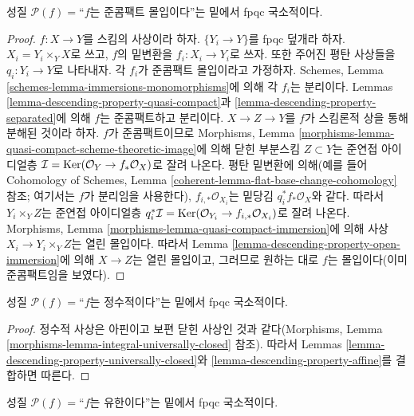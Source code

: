 \begin{lemma}
\label{lemma-descending-property-quasi-compact-immersion}
성질 $\mathcal{P}(f) =$“$f$는 준콤팩트 몰입이다”는 밑에서 fpqc
국소적이다.
\end{lemma}

\begin{proof}
$f : X \to Y$를 스킴의 사상이라 하자. $\{Y_i \to Y\}$를 fpqc
덮개라 하자. $X_i = Y_i \times_Y X$로 쓰고, $f$의 밑변환을
$f_i : X_i \to Y_i$로 쓰자. 또한 주어진 평탄 사상들을
$q_i : Y_i \to Y$로 나타내자. 각 $f_i$가 준콤팩트 몰입이라고
가정하자. Schemes, Lemma
\ref{schemes-lemma-immersions-monomorphisms}에 의해 각 $f_i$는 분리이다.
Lemmas \ref{lemma-descending-property-quasi-compact}과
\ref{lemma-descending-property-separated}에 의해 $f$는 준콤팩트하고
분리이다. $X \to Z \to Y$를 $f$가 스킴론적 상을 통해 분해된 것이라
하자. $f$가 준콤팩트이므로 Morphisms, Lemma
\ref{morphisms-lemma-quasi-compact-scheme-theoretic-image}에 의해 닫힌
부분스킴 $Z \subset Y$는 준연접 아이디얼층
$\mathcal{I} = \mathop{\mathrm{Ker}}(\mathcal{O}_Y \to f_*\mathcal{O}_X)$로 잘려 나온다.
평탄 밑변환에 의해(예를 들어 Cohomology of Schemes, Lemma
\ref{coherent-lemma-flat-base-change-cohomology} 참조; 여기서는 $f$가
분리임을 사용한다), $f_{i, *}\mathcal{O}_{X_i}$는 밑당김
$q_i^*f_*\mathcal{O}_X$와 같다. 따라서 $Y_i \times_Y Z$는 준연접
아이디얼층 $q_i^*\mathcal{I} =
\mathop{\mathrm{Ker}}(\mathcal{O}_{Y_i} \to f_{i, *}\mathcal{O}_{X_i})$로 잘려 나온다.
Morphisms, Lemma \ref{morphisms-lemma-quasi-compact-immersion}에 의해
사상 $X_i \to Y_i \times_Y Z$는 열린 몰입이다. 따라서 Lemma
\ref{lemma-descending-property-open-immersion}에 의해 $X \to Z$는
열린 몰입이고, 그러므로 원하는 대로 $f$는 몰입이다(이미 준콤팩트임을
보였다).
\end{proof}

\begin{lemma}
\label{lemma-descending-property-integral}
성질 $\mathcal{P}(f) =$“$f$는 정수적이다”는 밑에서 fpqc 국소적이다.
\end{lemma}

\begin{proof}
정수적 사상은 아핀이고 보편 닫힌 사상인 것과 같다(Morphisms, Lemma
\ref{morphisms-lemma-integral-universally-closed} 참조). 따라서 Lemmas
\ref{lemma-descending-property-universally-closed}와
\ref{lemma-descending-property-affine}를 결합하면 따른다.
\end{proof}

\begin{lemma}
\label{lemma-descending-property-finite}
성질 $\mathcal{P}(f) =$“$f$는 유한이다”는 밑에서 fpqc 국소적이다.
\end{lemma}

